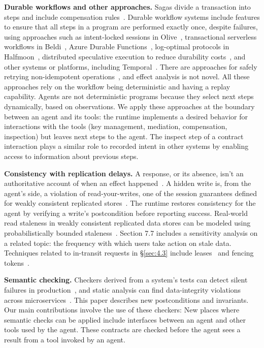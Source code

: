 \documentclass[letterpaper,twocolumn,10pt]{article}
\begin{document}
\textbf{Durable workflows and other approaches.} Sagas divide a transaction into steps and include compensation rules~\cite{garciamolina1987sagas}. Durable workflow systems include features to ensure that all steps in a program are performed exactly once, despite failures, using approaches such as intent-locked sessions in Olive~\cite{setty2016olive}, transactional serverless workflows in Beldi~\cite{zhang2020beldi}, Azure Durable Functions~\cite{burckhardt2021durable}, log-optimal protocols in Halfmoon~\cite{qi2023halfmoon}, distributed speculative execution to reduce durability costs~\cite{li2026dse}, and other systems or platforms, including Temporal~\cite{temporal}. There are approaches for safely retrying non-idempotent operations~\cite{xie2026incr}, and effect analysis is not novel. All these approaches rely on the workflow being deterministic and having a replay capability. Agents are not deterministic programs because they select next steps dynamically, based on observations. We apply these approaches at the boundary between an agent and its tools: the runtime implements a desired behavior for interactions with the tools (key management, mediation, compensation, inspection) but leaves next steps to the agent. The inspect step of a contract interaction plays a similar role to recorded intent in other systems by enabling access to information about previous steps.

\textbf{Consistency with replication delays.} A response, or its absence, isn't an authoritative account of when an effect happened~\cite{lamport1978clocks}. A hidden write is, from the agent's side, a violation of read-your-writes, one of the session guarantees defined for weakly consistent replicated stores~\cite{terry1994session}. The runtime restores consistency for the agent by verifying a write's postcondition before reporting success. Real-world read staleness in weakly consistent replicated data stores can be modeled using probabilistically bounded staleness~\cite{bailis2012pbs}. Section 7.7 includes a sensitivity analysis on a related topic: the frequency with which users take action on stale data. Techniques related to in-transit requests in \S\ref{sec:4.3} include leases~\cite{gray1989leases} and fencing tokens~\cite{kleppmann2017ddia}.

\textbf{Semantic checking.} Checkers derived from a system's tests can detect silent failures in production~\cite{lou2025t2c}, and static analysis can find data-integrity violations across microservices~\cite{ferreira2026aletheia}. This paper describes new postconditions and invariants. Our main contributions involve the use of these checkers: New places where semantic checks can be applied include interfaces between an agent and other tools used by the agent. These contracts are checked before the agent sees a result from a tool invoked by an agent.
\end{document}
